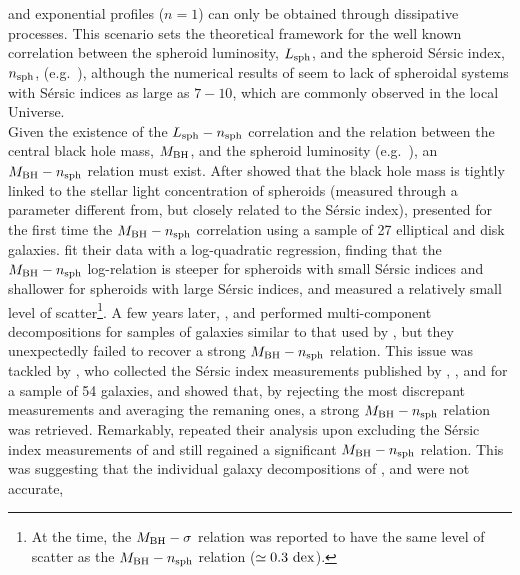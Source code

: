 \documentclass[preprint2]{emulateapj}
\begin{document}
and exponential profiles ($n=1$) can only be obtained through dissipative processes.
This scenario sets the theoretical framework for the well known correlation between the spheroid luminosity, $L_{\rm sph}$,  
and the spheroid S\'ersic index, $n_{\rm sph}$, (e.g.~\citealt{youngcurrie1994,jerjen2000,grahamguzman2003}), 
although the numerical results of \cite{nipoti2015} seem to lack of spheroidal systems with S\'ersic indices as large as $7 - 10$, 
which are commonly observed in the local Universe.  \\
Given the existence of the $L_{\rm sph} - n_{\rm sph}$ correlation 
and the relation between the central black hole mass, $M_{\rm BH}$, and the spheroid luminosity 
(e.g.~\citealt{kormendyrichstone1995,magorrian1998,marconihunt2003,haringrix2004}), 
an $M_{\rm BH} - n_{\rm sph}$ relation must exist. 
After \cite{graham2001bulges} showed that the black hole mass is tightly linked to the stellar light concentration of spheroids 
(measured through a parameter different from, but closely related to the S\'ersic index), 
\cite{grahamdriver2007} presented for the first time the $M_{\rm BH} - n_{\rm sph}$ correlation 
using a sample of 27 elliptical and disk galaxies. 
\cite{grahamdriver2007} fit their data with a log-quadratic regression, 
finding that the $M_{\rm BH} - n_{\rm sph}$ log-relation is steeper for spheroids with small S\'ersic indices 
and shallower for spheroids with large S\'ersic indices, 
and measured a relatively small level of scatter\footnote{At the time, the $M_{\rm BH} - \sigma$ relation 
\citep{ferraresemerritt2000,gebhardt2000} was reported to have the same level of scatter as the $M_{\rm BH} - n_{\rm sph}$ 
relation ($\simeq 0.3~\rm dex$). }.
A few years later, \cite{sani2011}, \cite{vika2012} and \cite{beifiori2012} performed multi-component decompositions 
for samples of galaxies similar to that used by \cite{grahamdriver2007}, 
but they unexpectedly failed to recover a strong $M_{\rm BH} - n_{\rm sph}$ relation. 
This issue was tackled by \cite{savorgnan2013}, who collected the S\'ersic index measurements published by 
\cite{grahamdriver2007}, \cite{sani2011}, \cite{vika2012} and \cite{beifiori2012} for a sample of 54 galaxies, 
and showed that, by rejecting the most discrepant measurements and averaging the remaning ones, 
a strong $M_{\rm BH} - n_{\rm sph}$ relation was retrieved. 
Remarkably, \cite{savorgnan2013} repeated their analysis upon excluding the S\'ersic index measurements of \cite{grahamdriver2007} 
and still regained a significant $M_{\rm BH} - n_{\rm sph}$ relation. 
This was suggesting that the individual galaxy decompositions of \cite{sani2011}, \cite{vika2012} and \cite{beifiori2012} were not accurate, 
\end{document}
